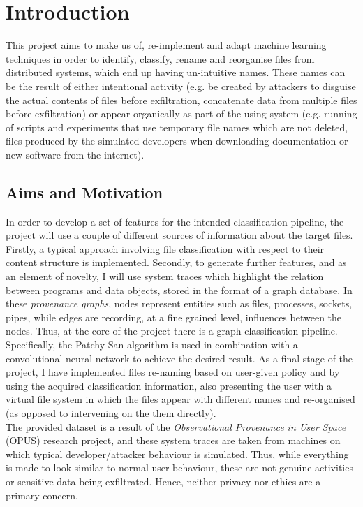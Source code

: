 

\chapter{Introduction}

This project aims to make us of, re-implement and adapt machine learning techniques in order to identify, classify, rename and reorganise files from distributed systems, which end up having un-intuitive names. These names can be the result of either intentional activity (e.g. be created by attackers to disguise the actual contents of files before exfiltration, concatenate data from multiple files before exfiltration) or appear organically as part of the using system (e.g. running of scripts and experiments that use temporary file names which are not deleted, files produced by the simulated developers when downloading documentation or new software from the internet). \\


\section{Aims and Motivation}  \label{1.1}

In order to develop a set of features for the intended classification pipeline, the project will use a couple of different sources of information about the target files. Firstly, a typical approach involving file classification with respect to their content structure is implemented. Secondly, to generate further features, and as an element of novelty, I will use system traces which highlight the relation between programs and data objects, stored in the format of a graph database. In these \textit{provenance graphs}, nodes represent entities such as files, processes, sockets, pipes, while edges are recording, at a fine grained level, influences between the nodes. Thus, at the core of the project there is a graph classification pipeline. Specifically, the Patchy-San algorithm is used in combination with a convolutional neural network to achieve the desired result. As a final stage of the project, I have implemented files re-naming based on user-given policy and by using the acquired classification information, also presenting the user with a virtual file system in which the files appear with different names and re-organised (as opposed to intervening on the them directly). \\

The provided dataset is a result of the \textit{Observational Provenance in User Space} (OPUS) research project, and these system traces are taken from machines on which typical developer/attacker behaviour is simulated. Thus, while everything is made to look similar to normal user behaviour, these are not genuine activities or sensitive data being exfiltrated. Hence, neither privacy nor ethics are a primary concern. \\

